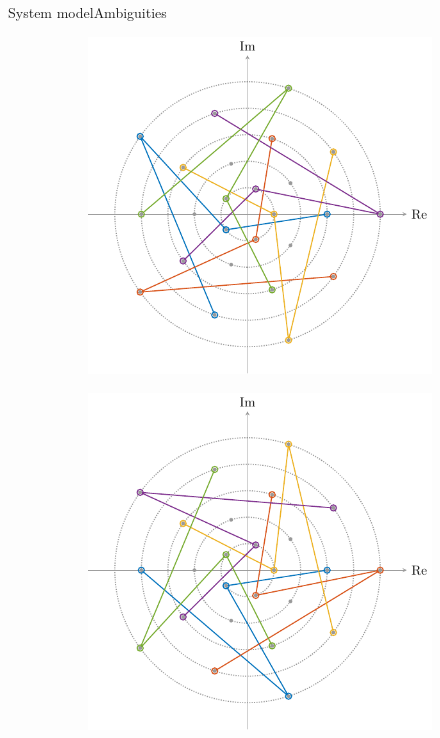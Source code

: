 \documentclass[en]{sdqbeamer}
\begin{document}
\begin{frame}{System model}{Ambiguities}
\begin{figure}[htb]
     \centering
     \begin{subfigure}[b]{0.4\textwidth}
         \centering
         \includegraphics[width=\textwidth]{Eq_class_construction_12.pdf}
     \end{subfigure}
     \hspace{10mm}
     \begin{subfigure}[b]{0.4\textwidth}
         \centering
         \includegraphics[width=\textwidth]{Eq_class_construction_13.pdf}
     \end{subfigure}
\end{figure}

\end{frame}
\end{document}
